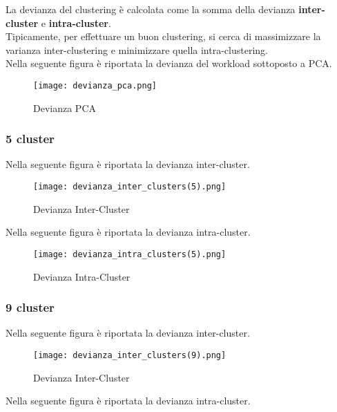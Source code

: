 La devianza del clustering è calcolata come la somma della devianza \textbf{inter-cluster}
e \textbf{intra-cluster}.\\
Tipicamente, per effettuare un buon clustering, si cerca di massimizzare la varianza
inter-clustering e minimizzare quella intra-clustering.\\
Nella seguente figura è riportata la devianza del workload sottoposto a PCA.\\

\begin{figure}[!htbp]
	\texttt{[image: devianza\_pca.png]}
  \caption{Devianza PCA}
  \label{}
\end{figure}
\clearpage

\subsubsection{5 cluster}

Nella seguente figura è riportata la devianza inter-cluster.\\

\begin{figure}[!htbp]
	\texttt{[image: devianza\_inter\_clusters(5).png]}
  \caption{Devianza Inter-Cluster}
  \label{}
\end{figure}

Nella seguente figura è riportata la devianza intra-cluster.\\

\begin{figure}[!htbp]
	\texttt{[image: devianza\_intra\_clusters(5).png]}
  \caption{Devianza Intra-Cluster}
  \label{}
\end{figure}
\clearpage

\subsubsection{9 cluster}

Nella seguente figura è riportata la devianza inter-cluster.\\

\begin{figure}[!htbp]
	\texttt{[image: devianza\_inter\_clusters(9).png]}
  \caption{Devianza Inter-Cluster}
  \label{}
\end{figure}

Nella seguente figura è riportata la devianza intra-cluster.\\

